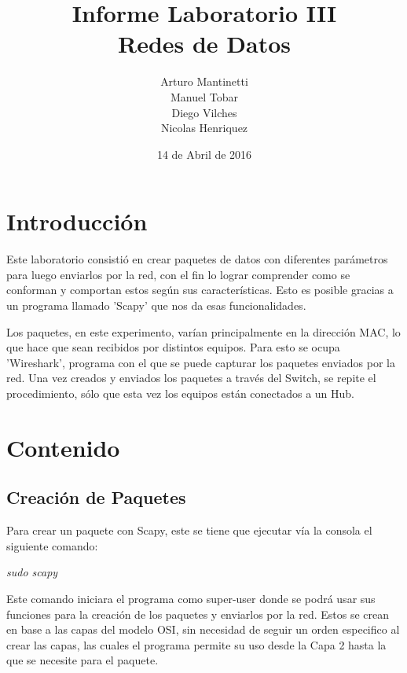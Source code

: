 \documentclass[spanish]{udpreport}
\title{Informe Laboratorio III \\ Redes de Datos}
\author{Arturo Mantinetti \\ Manuel Tobar \\ Diego Vilches \\ Nicolas Henriquez}
\date{14 de Abril de 2016}
\begin{document}
\maketitle

\tableofcontents

\chapter{Introducción}

Este laboratorio consistió en crear paquetes de datos con diferentes parámetros para luego enviarlos por la red, con el fin lo lograr comprender como se conforman y comportan estos según sus características. Esto es posible gracias a un programa llamado 'Scapy' que nos da esas funcionalidades. 

Los paquetes, en este experimento, varían principalmente en la dirección MAC, lo que hace que sean recibidos por distintos equipos. Para esto se ocupa 'Wireshark', programa con el que se puede capturar los paquetes enviados por la red.  Una vez creados y enviados los paquetes a través del Switch, se repite el procedimiento, sólo que esta vez los equipos están conectados a un Hub. 



\chapter{Contenido}

\section{Creación de Paquetes}
Para crear un paquete con Scapy, este se tiene que ejecutar vía la consola el siguiente comando:
\begin{center}
	\emph{sudo scapy}
\end{center}

Este comando iniciara el programa como super-user donde se podrá usar sus funciones para la creación de los paquetes y enviarlos por la red. Estos se crean en base a las capas del modelo OSI, sin necesidad de seguir un orden especifico al crear las capas, las cuales el programa permite su uso desde la Capa 2 hasta la que se necesite para el paquete.
\end{document}
